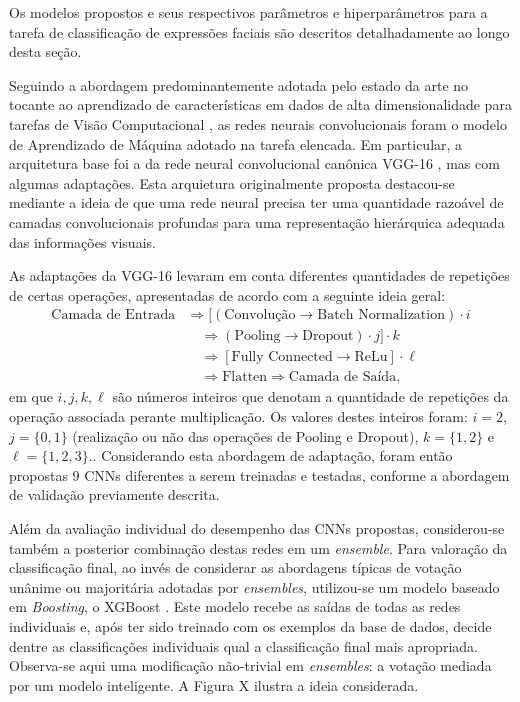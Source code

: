Os modelos propostos e seus respectivos parâmetros e hiperparâmetros para a tarefa de classificação de expressões faciais são descritos detalhadamente ao longo desta seção.

Seguindo a abordagem predominantemente adotada pelo estado da arte no tocante ao aprendizado de características em dados de alta dimensionalidade para tarefas de Visão Computacional \cite{Khan:Livro}, as redes neurais convolucionais foram o modelo de Aprendizado de Máquina adotado na tarefa elencada. Em particular, a arquitetura base foi a da rede neural convolucional canônica VGG-16 \cite{VGG}, mas com algumas adaptações. Esta arquietura originalmente proposta  destacou-se mediante a ideia de que uma rede neural precisa ter uma quantidade razoável  de camadas convolucionais profundas para uma representação hierárquica adequada das informações visuais.

As adaptações da VGG-16 levaram em conta diferentes quantidades de repetições de certas operações, apresentadas de acordo com a seguinte ideia geral:
\begin{equation}
\begin{split}
\textrm{Camada de Entrada} & \Rightarrow [ (\textrm{Convolução} \rightarrow \textrm{Batch Normalization})\cdot i\\
 &\quad \Rightarrow (\textrm{Pooling} \rightarrow \textrm{Dropout})\cdot j]\cdot k \\
 &\quad \Rightarrow [\textrm{Fully Connected} \rightarrow \textrm{ReLu}]\cdot \ell \\
 &\quad \Rightarrow \textrm{Flatten} \Rightarrow \textrm{Camada de Saída},
\end{split}
\end{equation} em que $i, j, k, \ell$ são números inteiros que denotam a quantidade de repetições da operação associada perante multiplicação. Os valores destes inteiros foram: $i = 2$, $j = \{0,1\}$ (realização ou não das operações de Pooling e Dropout), $k = \{1,2\}$ e $\ell = \{ 1,2,3 \}$.. Considerando esta abordagem de adaptação, foram então propostas $9$ CNNs diferentes a serem treinadas e testadas, conforme a abordagem de validação previamente descrita.


Além da avaliação individual do desempenho das CNNs propostas, considerou-se também a posterior combinação destas redes em um \emph{ensemble}. Para valoração da classificação final, ao invés de considerar as abordagens típicas de votação unânime ou majoritária adotadas por \emph{ensembles}, utilizou-se um modelo baseado em \emph{Boosting}, o XGBoost \cite{Chen:Boosting}. Este modelo recebe as saídas de todas as redes individuais e, após ter sido treinado com os exemplos da base de dados, decide dentre as classificações individuais qual a classificação final mais apropriada. Observa-se aqui uma modificação não-trivial em \emph{ensembles}: a votação mediada por um modelo inteligente. A Figura X ilustra a ideia considerada.

